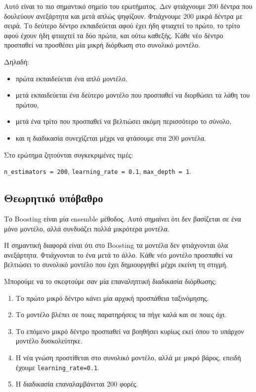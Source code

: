 \documentclass[12pt,a4paper]{article}
\newcommand{\code}[1]{\texttt{\textenglish{#1}}}
\begin{document}
Αυτό είναι το πιο σημαντικό σημείο του ερωτήματος. Δεν φτιάχνουμε 200 δέντρα
που δουλεύουν ανεξάρτητα και μετά απλώς ψηφίζουν. Φτιάχνουμε 200 μικρά δέντρα
με σειρά. Το δεύτερο δέντρο εκπαιδεύεται αφού έχει ήδη φτιαχτεί το πρώτο, το
τρίτο αφού έχουν ήδη φτιαχτεί τα δύο πρώτα, και ούτω καθεξής. Κάθε νέο δέντρο
προσπαθεί να προσθέσει μία μικρή διόρθωση στο συνολικό μοντέλο.

Δηλαδή:

\begin{itemize}
    \item πρώτα εκπαιδεύεται ένα απλό μοντέλο,
    \item μετά εκπαιδεύεται ένα δεύτερο μοντέλο που προσπαθεί να διορθώσει τα
    λάθη του πρώτου,
    \item μετά ένα τρίτο που προσπαθεί να βελτιώσει ακόμη περισσότερο το
    σύνολο,
    \item και η διαδικασία συνεχίζεται μέχρι να φτάσουμε στα 200 μοντέλα.
\end{itemize}

Στο ερώτημα ζητούνται συγκεκριμένες τιμές:

\begin{center}
\code{n\_estimators = 200}, \hspace{0.7cm}
\code{learning\_rate = 0.1}, \hspace{0.7cm}
\code{max\_depth = 1}.
\end{center}

\subsection{Θεωρητικό υπόβαθρο}

Το Boosting είναι μία ensemble μέθοδος. Αυτό σημαίνει ότι δεν βασίζεται σε ένα
μόνο μοντέλο, αλλά συνδυάζει πολλά μικρότερα μοντέλα.

Η σημαντική διαφορά είναι ότι στο Boosting τα μοντέλα δεν φτιάχνονται όλα
ανεξάρτητα. Φτιάχνονται το ένα μετά το άλλο. Κάθε νέο μοντέλο προσπαθεί να
βελτιώσει το συνολικό μοντέλο που έχει δημιουργηθεί μέχρι εκείνη τη στιγμή.

Μπορούμε να το σκεφτούμε σαν μία επαναληπτική διαδικασία διόρθωσης:

\begin{enumerate}
    \item Το πρώτο μικρό δέντρο κάνει μία αρχική προσπάθεια ταξινόμησης.
    \item Το μοντέλο βλέπει σε ποιες παρατηρήσεις τα πήγε καλά και σε ποιες
    όχι.
    \item Το επόμενο μικρό δέντρο προσπαθεί να βοηθήσει κυρίως εκεί όπου το
    υπάρχον μοντέλο δυσκολεύτηκε.
    \item Η νέα γνώση προστίθεται στο συνολικό μοντέλο, αλλά με μικρό βάρος,
    επειδή έχουμε \code{learning\_rate=0.1}.
    \item Η διαδικασία επαναλαμβάνεται 200 φορές.
\end{enumerate}
\end{document}
